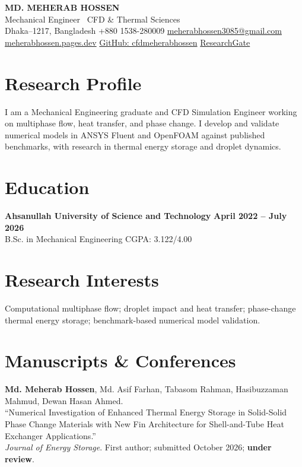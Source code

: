 \documentclass[11pt,a4paper]{article}
\begin{document}
\begin{center}
  {\fontsize{25}{28}\selectfont\bfseries MD. MEHERAB HOSSEN}\\[3pt]
  {\normalsize Mechanical Engineer \textbar\ CFD \& Thermal Sciences}\\[4pt]
  {\small Dhaka--1217, Bangladesh \enspace\textbar\enspace +880 1538-280009
  \enspace\textbar\enspace
  \href{mailto:meherabhossen3085@gmail.com}{meherabhossen3085@gmail.com}}\\[2pt]
  {\small\href{https://meherabhossen.pages.dev/}{meherabhossen.pages.dev}
  \enspace\textbar\enspace
  \href{https://github.com/cfdmeherabhossen}{GitHub: cfdmeherabhossen}
  \enspace\textbar\enspace
  \href{https://www.researchgate.net/profile/Md-Meherab-Hossen}{ResearchGate}}
\end{center}
\vspace{-7pt}

\section*{Research Profile}
I am a Mechanical Engineering graduate and CFD Simulation Engineer working on multiphase flow,
heat transfer, and phase change. I develop and validate numerical models in ANSYS Fluent and
OpenFOAM against published benchmarks, with research in thermal energy storage and droplet dynamics.

\section*{Education}
\textbf{Ahsanullah University of Science and Technology}
\hfill\textbf{April 2022 -- July 2026}\\
B.Sc. in Mechanical Engineering \hfill CGPA: 3.122/4.00

\section*{Research Interests}
Computational multiphase flow; droplet impact and heat transfer; phase-change thermal energy
storage; benchmark-based numerical model validation.

\section*{Manuscripts \& Conferences}
\begingroup\fontsize{10.5}{12.5}\selectfont
\textbf{Md. Meherab Hossen}, Md. Asif Farhan, Tabasom Rahman, Hasibuzzaman Mahmud, Dewan Hasan Ahmed.\\
``Numerical Investigation of Enhanced Thermal Energy Storage in Solid-Solid Phase Change Materials with New Fin Architecture for Shell-and-Tube Heat Exchanger Applications.''\\
\textit{Journal of Energy Storage}. First author; submitted October 2026; \textbf{under review}.
\end{document}
